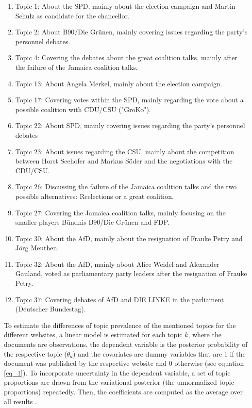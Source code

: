 \documentclass[12pt,a4paper,notitlepage]{article}
\begin{document}
\begin{enumerate}
	\item Topic 1: About the SPD, mainly about the election campaign and Martin Schulz as candidate for the chancellor.	
	\item Topic 2: About B90/Die Grünen, mainly covering issues regarding the party's personnel debates.
	\item Topic 4: Covering the debates about the great coalition talks, mainly after the failure of the Jamaica coalition talks.
	\item Topic 13: About Angela Merkel, mainly about the election campaign. 
	\item Topic 17: Covering votes within the SPD, mainly regarding the vote about a possible coalition with CDU/CSU ("GroKo").	
	\item Topic 22: About SPD, mainly covering issues regarding the party's personnel debates
	\item Topic 23: About issues regarding the CSU, mainly about the competition between Horst Seehofer and Markus Söder and the negotiations with the CDU/CSU.
	\item Topic 26: Discussing the failure of the Jamaica coalition talks and the two possible alternatives: Reelections or a great coalition.
	\item Topic 27: Covering the Jamaica coalition talks, mainly focusing on the smaller players Bündnis B90/Die Grünen and FDP.	
	\item Topic 30: About the AfD, mainly about the resignation of Frauke Petry and Jörg Meuthen.
	\item Topic 32: About the AfD, mainly about Alice Weidel and Alexander Gauland, voted as parliamentary party leaders after the resignation of Frauke Petry.
	\item Topic 37: Covering debates of AfD and DIE LINKE in the parliament (Deutscher Bundestag).
\end{enumerate}   

To estimate the differences of topic prevalence of the mentioned topics for the different websites, a linear model is estimated for each topic $k$, where the documents are observations, the dependent variable is the posterior probability of the respective topic ($\theta_{d}$) and the covariates are dummy variables that are 1 if the document was published by the respective website and 0 otherwise (see equation \ref{eq_1}). To incorporate uncertainty in the dependent variable, a set of topic proportions are drawn from the variational posterior (the unnormalized topic proportions) repeatedly. Then, the coefficients are computed as the average over all results \citep{roberts_model_2016}.
\end{document}

